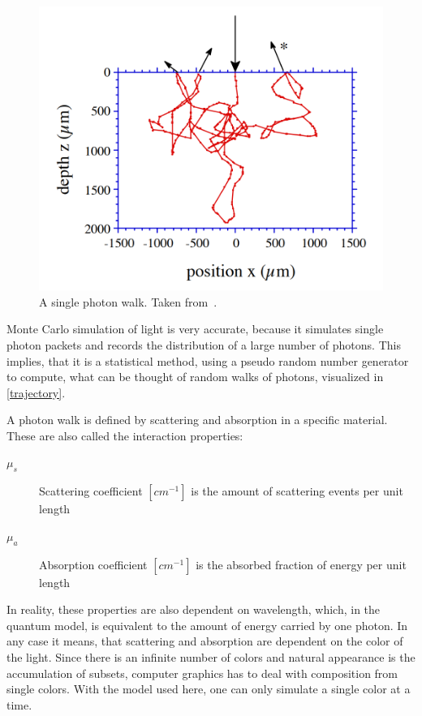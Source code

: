 \documentclass[]{article}
\begin{document}
\begin{figure}[ht!]
	\includegraphics[width=\linewidth]{img/trajectory.png}
	\caption{A single photon walk. Taken from~\cite{wang1992monte}.}
	\label{trajectory}
\end{figure}

Monte Carlo simulation of light is very accurate, because it simulates single photon packets and records the distribution of a large number of photons. This implies, that it is a statistical method, using a pseudo random number generator to compute, what can be thought of random walks of photons, visualized in \autoref{trajectory}.

A photon walk is defined by scattering and absorption in a specific material. These are also called the interaction properties:

\begin{description}
	\item[$\mu_s$] Scattering coefficient $[cm^{-1}]$ is the amount of scattering events per unit length
	\item[$\mu_a$] Absorption coefficient $[cm^{-1}]$ is the absorbed fraction of energy per unit length
\end{description}

In reality, these properties are also dependent on wavelength, which, in the quantum model, is equivalent to the amount of energy carried by one photon. In any case it means, that scattering and absorption are dependent on the color of the light. Since there is an infinite number of colors and natural appearance is the accumulation of subsets, computer graphics has to deal with composition from single colors. With the model used here, one can only simulate a single color at a time.
\end{document}
